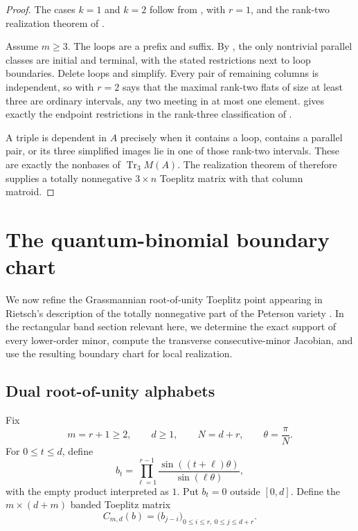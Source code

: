 \documentclass[11pt]{amsart}
\theoremstyle{definition}
\theoremstyle{remark}
\newcommand{\Tr}{\operatorname{Tr}}
\begin{document}
\begin{proof}
The cases $k=1$ and $k=2$ follow from ,  with $r=1$, and the rank-two realization theorem of \cite[Theorem~3]{CGQlow}.

Assume $m\ge3$.  The loops are a prefix and suffix.  By , the only nontrivial parallel classes are initial and terminal, with the stated restrictions next to loop boundaries.  Delete loops and simplify.  Every pair of remaining columns is independent, so  with $r=2$ says that the maximal rank-two flats of size at least three are ordinary intervals, any two meeting in at most one element.   gives exactly the endpoint restrictions in the rank-three classification of \cite[Theorems~1 and~13]{CGQlow}.

A triple is dependent in $A$ precisely when it contains a loop, contains a parallel pair, or its three simplified images lie in one of those rank-two intervals.  These are exactly the nonbases of $\Tr_3M(A)$.  The realization theorem of \cite{CGQlow} therefore supplies a totally nonnegative $3\times n$ Toeplitz matrix with that column matroid.
\end{proof}

\section{The quantum-binomial boundary chart}\label{sec:qpoint}

We now refine the Grassmannian root-of-unity Toeplitz point appearing in Rietsch's description of the totally nonnegative part of the Peterson variety \cite{RietschGrassmannian,Rietsch}.  In the rectangular band section relevant here, we determine the exact support of every lower-order minor, compute the transverse consecutive-minor Jacobian, and use the resulting boundary chart for local realization.

\subsection{Dual root-of-unity alphabets}

Fix
\[
 m=r+1\ge2,
 \qquad d\ge1,
 \qquad N=d+r,
 \qquad \theta=\frac{\pi}{N}.
\]
For $0\le t\le d$, define
\begin{equation}\label{eq:qbin-b}
 b_t=\prod_{\ell=1}^{r-1}
 \frac{\sin((t+\ell)\theta)}{\sin(\ell\theta)},
\end{equation}
with the empty product interpreted as $1$.  Put $b_t=0$ outside $[0,d]$.  Define the $m\times(d+m)$ banded Toeplitz matrix
\begin{equation}\label{eq:C-m-d}
 C_{m,d}(b)=\bigl(b_{j-i}\bigr)_{0\le i\le r,\ 0\le j\le d+r}.
\end{equation}
\end{document}
